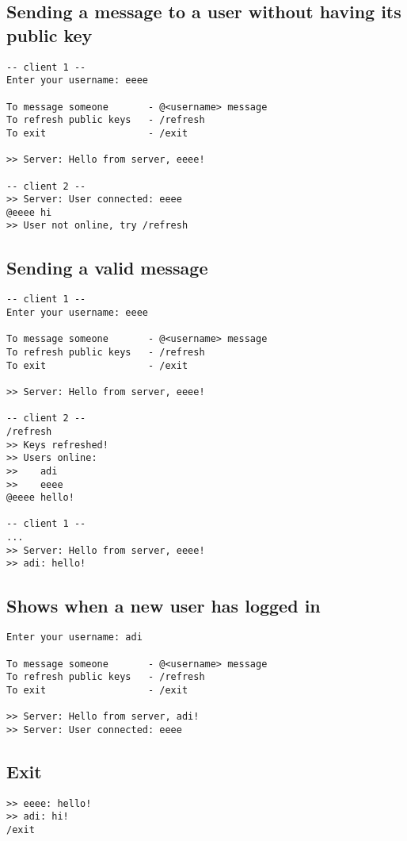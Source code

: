 \documentclass[11pt]{article}
\begin{document}
\subsection{Sending a message to a user without having its public key}
\label{sec:orgc9b3c46}
\begin{verbatim}
-- client 1 --
Enter your username: eeee

To message someone       - @<username> message
To refresh public keys   - /refresh
To exit                  - /exit

>> Server: Hello from server, eeee!

-- client 2 --
>> Server: User connected: eeee
@eeee hi
>> User not online, try /refresh
\end{verbatim}

\subsection{Sending a valid message}
\label{sec:orgef29b95}
\begin{verbatim}
-- client 1 --
Enter your username: eeee

To message someone       - @<username> message
To refresh public keys   - /refresh
To exit                  - /exit

>> Server: Hello from server, eeee!

-- client 2 --
/refresh
>> Keys refreshed!
>> Users online:
>>    adi
>>    eeee
@eeee hello!

-- client 1 --
...
>> Server: Hello from server, eeee!
>> adi: hello!
\end{verbatim}

\subsection{Shows when a new user has logged in}
\label{sec:orgcf59003}
\begin{verbatim}
Enter your username: adi

To message someone       - @<username> message
To refresh public keys   - /refresh
To exit                  - /exit

>> Server: Hello from server, adi!
>> Server: User connected: eeee
\end{verbatim}

\subsection{Exit}
\label{sec:org3d34875}
\begin{verbatim}
>> eeee: hello!
>> adi: hi!
/exit
\end{verbatim}
\end{document}
